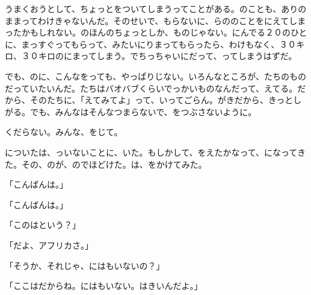 うまくおうとして、ちょっとをついてしまうってことがある。のことも、ありのままってわけきゃないんだ。そのせいで、もらないに、らののことをにえてしまったかもしれない。のほんのちょっとしか、ものじゃない。にんでる２０のひとに、まっすぐってもらって、みたいにりまってもらったら、わけもなく、３０キロ、３０キロのにまってしまう。でちっちゃいにだって、ってしまうはずだ。

でも、のに、こんなをっても、やっぱりじない。いろんなところが、たちのものだっていたいんだ。たちはバオバブくらいでっかいものなんだって、えてる。だから、そのたちに、「えてみてよ」って、いってごらん。がきだから、きっとしがる。でも、みんなはそんなつまらないで、をつぶさないように。

くだらない。みんな、をじて。

についたは、っいないことに、いた。もしかして、をえたかなって、になってきた。その、のが、のでほどけた。は、をかけてみた。

「こんばんは。」

「こんばんは。」

「このはという？」

「だよ、アフリカさ。」

「そうか、それじゃ、にはもいないの？」

「ここはだからね。にはもいない。はきいんだよ。」

